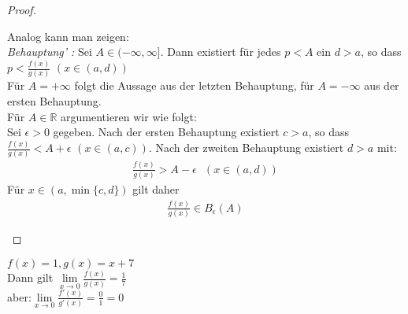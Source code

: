 \begin{proof}
\begin{itemize}
		Analog kann man zeigen: \\
		\emph{Behauptung' :} Sei $A  \in (-\infty, \infty]$. Dann existiert für 
		jedes $p <A$ ein $d > a$, so dass $p < \frac{f(x)}{g(x)}$ $(x \in (a,d))$\\
		Für $A = +\infty$ folgt die Aussage aus der letzten Behauptung, für 
		$ A = - \infty$ aus der ersten Behauptung. \\
		Für $A \in \mathbb{R}$ argumentieren wir wie folgt: \\
		Sei $\epsilon > 0$ gegeben. Nach der ersten Behauptung existiert 
		$c > a$, so dass $\frac{f(x)}{g(x)} < A + \epsilon$ $(x\in (a,c))$. 
		Nach der zweiten Behauptung existiert $d > a$ mit:
		\begin{align*}
			\frac{f(x)}{g(x)} > A - \epsilon \text{ } (x \in (a,d))
		\end{align*}
		Für $x \in (a, \min\{c,d\})$ gilt daher
		\begin{align*}
			\frac{f(x)}{g(x)} \in B_{\epsilon}(A)
		\end{align*}
	\end{itemize}	
\end{proof}

\begin{Beispiel}{
	$f(x) = 1, g(x) = x + 7$\\
	Dann gilt $\lim\limits_{x \rightarrow 0 }{\frac{f(x)}{g(x)} = \frac{1}{7}}$ \\
 aber:$ \lim\limits_{x \rightarrow 0 }{\frac{f'(x)}{g'(x)} = \frac{0}{	1}= 0}$
}\end{Beispiel}
